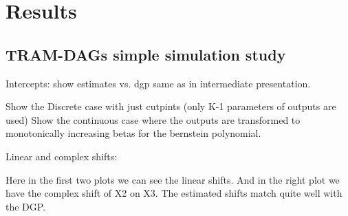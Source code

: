 











\chapter{Results}



% 


\section{TRAM-DAGs simple simulation study}

Intercepts: show estimates vs. dgp same as in intermediate presentation.

Show the Discrete case with just cutpints (only K-1 parameters of outputs are used)
Show the continuous case where the outputs are transformed to monotonically increasing betas for the bernstein polynomial.

Linear and complex shifts: 

Here in the first two plots we can see the linear shifts. And in the right plot we have the complex shift of X2 on X3. The estimated shifts match quite well with the DGP.


